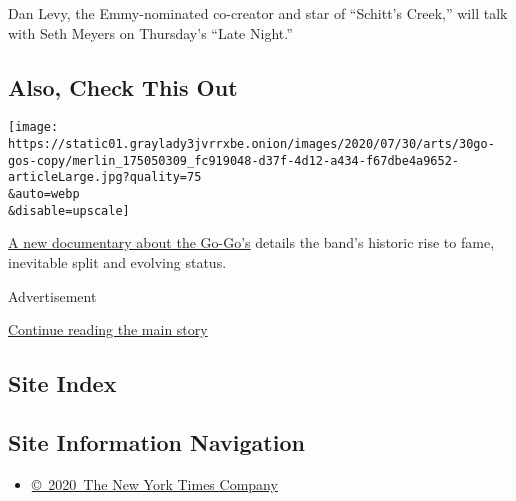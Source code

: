Dan Levy, the Emmy-nominated co-creator and star of ``Schitt's Creek,''
will talk with Seth Meyers on Thursday's ``Late Night.''

\hypertarget{also-check-this-out}{%
\subsection{Also, Check This Out}\label{also-check-this-out}}

\texttt{[image: https://static01.graylady3jvrrxbe.onion/images/2020/07/30/arts/30go-gos-copy/merlin\_175050309\_fc919048-d37f-4d12-a434-f67dbe4a9652-articleLarge.jpg?quality=75\\\&auto=webp\\\&disable=upscale]}

\href{https://www.nytimes3xbfgragh.onion/2020/07/29/arts/music/the-go-gos-documentary.html}{A
new documentary about the Go-Go's} details the band's historic rise to
fame, inevitable split and evolving status.

Advertisement

\protect\hyperlink{after-bottom}{Continue reading the main story}

\hypertarget{site-index}{%
\subsection{Site Index}\label{site-index}}

\hypertarget{site-information-navigation}{%
\subsection{Site Information
Navigation}\label{site-information-navigation}}

\begin{itemize}
\tightlist
\item
  \href{https://help.nytimes3xbfgragh.onion/hc/en-us/articles/115014792127-Copyright-notice}{©~2020~The
  New York Times Company}
\end{itemize}

